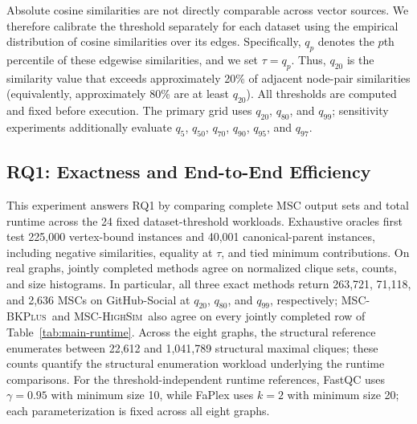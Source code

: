 \documentclass[sigconf, nonacm]{acmart}
\newcommand{\subEnum}{MSC-\textsc{BKPlus}}
\newcommand{\monoSemMCE}{MSC-\textsc{HighSim}}
\begin{document}
Absolute cosine similarities are not directly comparable across vector sources.
We therefore calibrate the threshold separately for each dataset using the
empirical distribution of cosine similarities over its edges. Specifically,
$q_p$ denotes the $p$th percentile of these edgewise similarities, and we set
$\tau=q_p$. Thus, $q_{20}$ is the similarity value that exceeds approximately
20\% of adjacent node-pair similarities (equivalently, approximately 80\% are
at least $q_{20}$). All thresholds are computed and fixed before execution. The
primary grid uses $q_{20}$, $q_{80}$, and $q_{99}$; sensitivity experiments
additionally evaluate $q_{5}$, $q_{50}$, $q_{70}$, $q_{90}$, $q_{95}$, and
$q_{97}$.

\subsection{RQ1: Exactness and End-to-End Efficiency}
This experiment answers RQ1 by comparing complete MSC output sets and total
runtime across the 24 fixed dataset-threshold workloads. Exhaustive oracles first test 225,000
vertex-bound instances and 40,001 canonical-parent instances, including
negative similarities, equality at $\tau$, and tied minimum contributions.
On real graphs, jointly completed methods agree on normalized clique sets,
counts, and size histograms. In particular, all three exact methods return
263,721, 71,118, and 2,636 MSCs on GitHub-Social at $q_{20}$, $q_{80}$, and
$q_{99}$, respectively; \subEnum\ and \monoSemMCE\ also agree on every jointly
completed row of Table~\ref{tab:main-runtime}.
Across the eight graphs, the structural reference enumerates between 22,612 and 1,041,789 structural maximal cliques; these counts quantify the structural enumeration workload underlying the runtime comparisons.
For the threshold-independent runtime references, FastQC uses
$\gamma=0.95$ with minimum size 10, while FaPlex uses $k=2$ with minimum
size 20; each parameterization is fixed across all eight graphs.
\end{document}
